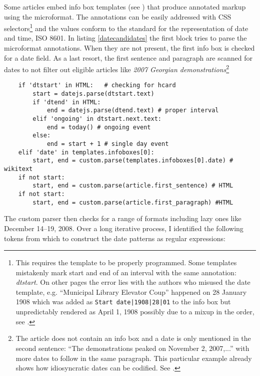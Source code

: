 Some articles embed info box templates (see ) that produce annotated markup using the  microformat.
The annotations can be easily addressed with CSS selectors\footnote{This requires the template to be properly programmed. Some templates mistakenly mark start and end of an interval with the same annotation: \emph{dtstart}. On other pages the error lies with the authors who misused the date template, e.g. ``Municipal Library Elevator Coup'' happened on 28 January 1908 which was added as  \verb"Start date|1908|28|01" to the info box but unpredictably rendered as April 1, 1908 possibly due to a mixup in the order, see .} and the values conform to the standard for the representation of date and time, ISO 8601.
In listing \ref{datecandidates} the first block tries to parse the microformat annotations.
When they are not present, the first info box is checked for a date field.
As a last resort, the first sentence and paragraph are scanned for dates to not filter out eligible articles like \emph{2007 Georgian demonstrations}\footnote{The article does not contain an info box and a date is only mentioned in the second sentence: ``The demonstrations peaked on November 2, 2007,...'' with more dates to follow in the same paragraph. This particular example already shows how idiosyncratic dates can be codified. See .}

\begin{lstlisting}
	if 'dtstart' in HTML:	# checking for hcard
		start = datejs.parse(dtstart.text)
		if 'dtend' in HTML:
			end = datejs.parse(dtend.text) # proper interval
		elif 'ongoing' in dtstart.next.text:
			end = today() # ongoing event
		else:
			end = start + 1 # single day event
	elif 'date' in templates.infoboxes[0]:
		start, end = custom.parse(templates.infoboxes[0].date) # wikitext
	if not start:
		start, end = custom.parse(article.first_sentence) # HTML
	if not start:
		start, end = custom.parse(article.first_paragraph) #HTML
\end{lstlisting}

The custom parser then checks for a range of formats including lazy ones like December 14--19, 2008.
Over a long iterative process, I identified the following tokens from which to construct the date patterns as regular expressions:

